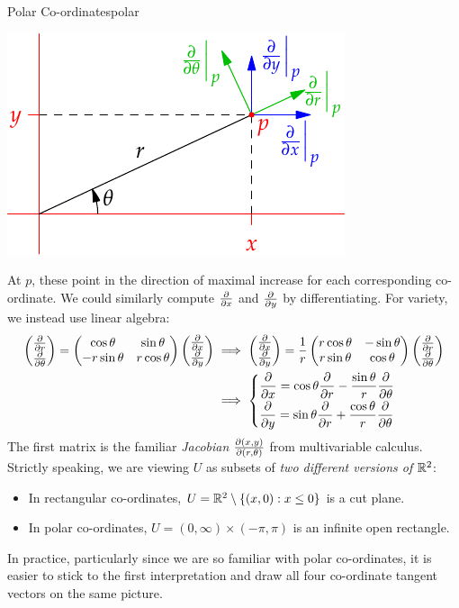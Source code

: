 \begin{example}{Polar Co-ordinates}{polar}
\begin{minipage}[t]{0.39\linewidth}
\flushright\includegraphics{forms-polar}
\end{minipage}\bigbreak
At $p$, these point in the direction of maximal increase for each corresponding co-ordinate.\smallbreak
We could similarly compute $\partials x$ and $\partials y$ by differentiating. For variety, we instead use linear algebra:
\begin{align*}
\twovec{\partials r}{\partials\theta}
=
\begin{pmatrix}
\cos\theta&\sin\theta\\
-r\sin\theta&r\cos\theta
\end{pmatrix}
\twovec{\partials x}{\partials y}
&\implies
\twovec{\partials x}{\partials y}
=
\frac 1r\begin{pmatrix}
r\cos\theta&-\sin\theta\\
r\sin\theta&\cos\theta
\end{pmatrix}
\twovec{\partials r}{\partials\theta}\\
&\implies
\begin{cases}
\displaystyle \partials x=\cos\theta\partials r-\frac{\sin\theta}r\partials\theta\\[5pt]
\displaystyle \partials y=\sin\theta\partials r+\frac{\cos\theta}r\partials\theta
\end{cases}
\end{align*}
The first matrix is the familiar \emph{Jacobian} $\partials[(x,y)]{(r,\theta)}$ from multivariable calculus.
Strictly speaking, we are viewing $U$ as subsets of \emph{two different versions of $\R^2$}:
\begin{itemize}
  \item In rectangular co-ordinates, $U=\R^2\setminus\{(x,0):x\le 0\}$ is a cut plane.
  \item In polar co-ordinates, $U=(0,\infty)\times(-\pi,\pi)$ is an infinite open rectangle.
\end{itemize}
In practice, particularly since we are so familiar with polar co-ordinates, it is easier to stick to the first interpretation and draw all four co-ordinate tangent vectors on the same picture.
\end{example}


